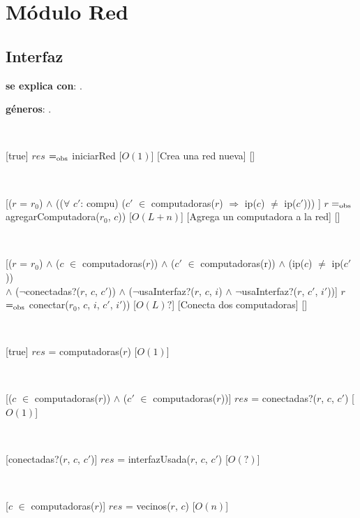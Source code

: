 \section{Módulo Red}

\subsection{Interfaz}

\textbf{se explica con}: .

\textbf{géneros}: .

  ~

  [true]
  {$res$ $=_{\mathrm{obs}}$ iniciarRed}
  [$O(1)$]
  [Crea una red nueva]
  []

  ~

  [($r$ = $r_0$) $\land$ (($\forall$ $c'$: compu) ($c'$ $\in$ computadoras($r$) $\Rightarrow$  ip($c$) $\neq$  ip($c'$)))  ]
  {$r$ $=_{\mathrm{obs}}$ agregarComputadora($r_0$, $c$)) }
  [$O(L + n)$]
  [Agrega un computadora a la red]
  []

  ~

  [($r$ = $r_0$) $\land$ ($c$ $\in$ computadoras($r$)) $\land$ ($c'$ $\in$ computadoras(r)) $\land$ (ip($c$) $\neq$ ip($c'$)) \\
   $\land$ ($\neg$conectadas?($r$, $c$, $c'$)) $\land$ ($\neg$usaInterfaz?($r$, $c$, $i$) $\land$ $\neg$usaInterfaz?($r$, $c'$, $i'$))]
  {$r$ $=_{\mathrm{obs}}$ conectar($r_0$, $c$, $i$, $c'$, $i'$))}
  [$O(L) ?$]
  [Conecta dos computadoras]
  []

  ~

  [true]  
  {$res$ = computadoras($r$)}
  [$O(1)$]

  ~

  [($c$ $\in$ computadoras($r$)) $\land$ ($c'$ $\in$ computadoras($r$))]
  {$res$ = conectadas?($r$, $c$, $c'$)}
  [$O(1)$]

  ~

  [conectadas?($r$, $c$, $c'$)]
  {$res$ = interfazUsada($r$, $c$, $c'$)}
  [$O(?)$]

  ~

  [$c$ $\in$ computadoras($r$)]
  {$res$ = vecinos($r$, $c$)}
  [$O(n)$]


